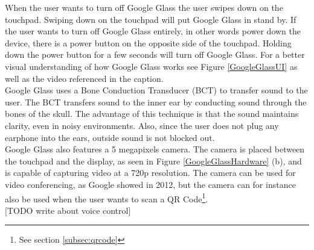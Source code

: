When the user wants to turn off Google Glass the user swipes down on the touchpad. Swiping down on the touchpad will put Google Glass in stand by. If the user wants to turn off Google Glass entirely, in other words power down the device, there is a power button on the opposite side of the touchpad. Holding down the power button for a few seconds will turn off Google Glass. For a better visual understanding of how Google Glass works see Figure \ref{GoogleGlassUI} as well as the video referenced in the caption.\\

Google Glass uses a Bone Conduction Transducer (BCT) to transfer sound to the user.\cite{GlassSpecs} The BCT transfers sound to the inner ear by conducting sound through the bones of the skull.\cite{boneConductionWiki} The advantage of this technique is that the sound maintains clarity, even in noisy environments. Also, since the user does not plug any earphone into the ears, outside sound is not blocked out.\\

Google Glass also features a 5 megapixels camera. The camera is placed between the touchpad and the display, as seen in Figure \ref{GoogleGlassHardware} (b), and is capable of capturing video at a 720p resolution. The camera can be used for video conferencing, as Google showed in 2012\cite{glassLiveDemo}, but the camera can for instance also be used when the user wants to scan a QR Code\footnote{See section \ref{subsec:qrcode}}.\\

[TODO write about voice control]




